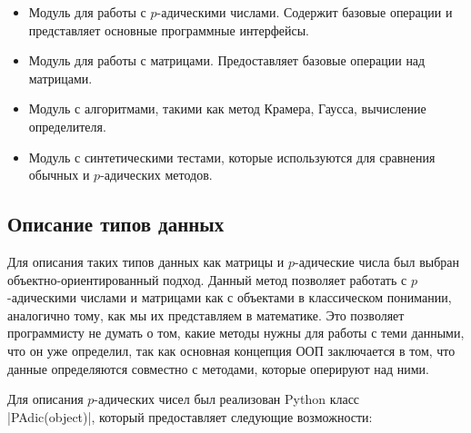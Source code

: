 \documentclass[master, och, diploma, times]{sty/SCWorks}
\theoremstyle{plain}
\theoremstyle{definition}
\begin{document}
\begin{itemize}
 
  \item Модуль для работы с $p$-адическими числами. Содержит базовые операции и представляет основные программные интерфейсы. 
  \item Модуль для работы с матрицами. Предоставляет базовые операции над матрицами.
  \item Модуль с алгоритмами, такими как метод Крамера, Гаусса, вычисление определителя.
  \item Модуль с синтетическими тестами, которые используются для сравнения обычных и $p$-адических методов.
 
\end{itemize}


\subsection{Описание типов данных}

Для описания таких типов данных как матрицы и $p$-адические числа был выбран объектно-ориентированный подход. Данный метод позволяет работать с $p$-адическими числами и матрицами как с объектами в классическом понимании, аналогично тому, как мы их представляем в математике. Это позволяет программисту не думать о том, какие методы нужны для работы с теми данными, что он уже определил, так как основная концепция ООП заключается в том, что данные определяются совместно с методами, которые оперируют над ними.


Для описания $p$-адических чисел был реализован Python класс \\ |PAdic(object)|, который предоставляет следующие возможности:
\end{document}
